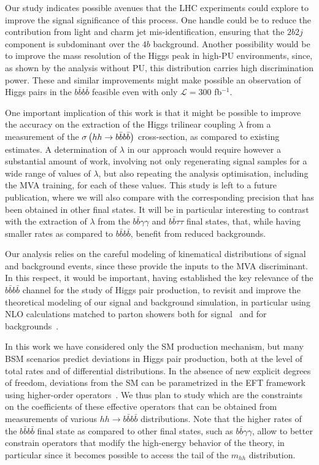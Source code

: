 Our study indicates possible avenues that the LHC experiments
could explore to improve the signal significance of this
process.
%
One handle could be to reduce the contribution from light and charm
jet mis-identification, ensuring that the
$2b2j$ component is subdominant over the $4b$ background.
%
Another possibility would be to improve the mass resolution of the Higgs peak
in high-PU environments, since, as shown by the analysis without PU, this
distribution carries high discrimination power.
%
These and similar improvements
 might make possible an observation of Higgs pairs
in the $b\bar{b}b\bar{b}$ feasible even with only
$\mathcal{L}=300$ fb$^{-1}$.

One important implication of this work is that it might
be possible to improve  the accuracy on the extraction of
the Higgs trilinear coupling $\lambda$ from
a measurement of the
$\sigma\left( hh\to b\bar{b}b\bar{b}\right)$ cross-section, as compared
to existing estimates.
%
A determination of $\lambda$ in our approach would require
 however a substantial
 amount of work, involving
 not only regenerating signal samples
 for a wide range of values of  $\lambda$, but also
 repeating the analysis
optimisation, including the MVA training, for each
of these values.
%
This study is left to a future
publication, where we will also
compare with the corresponding  precision 
that has been obtained in other final states.
%
It will be in particular interesting to contrast
with the extraction of $\lambda$ from the
 $b\bar{b}\gamma\gamma$
and $b\bar{b}\tau\tau$ final states, that, while having
smaller rates as compared to $b\bar{b}b\bar{b}$,
benefit from reduced backgrounds.
%


Our analysis relies on the careful modeling of kinematical
distributions of signal and background events, since these provide
the inputs to the MVA discriminant.
%
In this respect, it would be important, having established the key
relevance of the $b\bar{b}b\bar{b}$ channel for the study of
Higgs pair production, to revisit and improve the
theoretical modeling of our signal and background simulation,
in particular using NLO calculations matched to
parton showers both for signal~\cite{Frederix:2014hta,Maierhofer:2013sha}
and for backgrounds~\cite{Alwall:2014hca,Gleisberg:2008ta}.
%

In this work we have considered only the SM production mechanism,
but many BSM scenarios predict deviations
in Higgs pair production, both at the level of total rates
and of
differential distributions.
%
In the absence of new explicit degrees of freedom,
deviations from the SM can be parametrized in
the EFT framework using higher-order
operators~\cite{Azatov:2015oxa,Goertz:2014qta}.
%
We thus plan to study which are the constraints
on the coefficients of these effective
operators that can be obtained from measurements
of various $hh\to b\bar{b}b\bar{b}$ distributions.
%
Note that the higher rates of the $b\bar{b}b\bar{b}$ final state as compared to
other final states, such as
$b\bar{b}\gamma\gamma$, allow to better constrain operators
that modify the high-energy behavior
of the theory, in particular
since it becomes possible
to access the tail of the $m_{hh}$ distribution.


